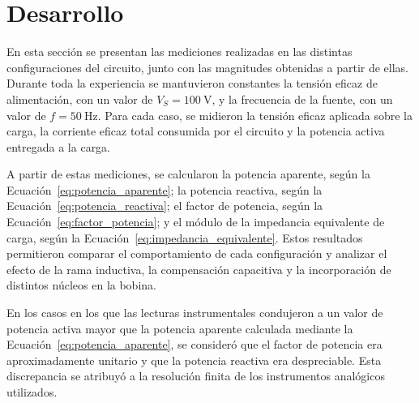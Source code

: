 
\section{Desarrollo}

En esta sección se presentan las mediciones realizadas en las distintas configuraciones del circuito, junto con las magnitudes obtenidas a partir de ellas. Durante toda la experiencia se mantuvieron constantes la tensión eficaz de alimentación, con un valor de $V_S=\SI{100}{\volt}$, y la frecuencia de la fuente, con un valor de $f=\SI{50}{\hertz}$. Para cada caso, se midieron la tensión eficaz aplicada sobre la carga, la corriente eficaz total consumida por el circuito y la potencia activa entregada a la carga.

A partir de estas mediciones, se calcularon la potencia aparente, según la Ecuación~\ref{eq:potencia_aparente}; la potencia reactiva, según la Ecuación~\ref{eq:potencia_reactiva}; el factor de potencia, según la Ecuación~\ref{eq:factor_potencia}; y el módulo de la impedancia equivalente de carga, según la Ecuación~\ref{eq:impedancia_equivalente}. Estos resultados permitieron comparar el comportamiento de cada configuración y analizar el efecto de la rama inductiva, la compensación capacitiva y la incorporación de distintos núcleos en la bobina.

En los casos en los que las lecturas instrumentales condujeron a un valor de potencia activa mayor que la potencia aparente calculada mediante la Ecuación~\ref{eq:potencia_aparente}, se consideró que el factor de potencia era aproximadamente unitario y que la potencia reactiva era despreciable. Esta discrepancia se atribuyó a la resolución finita de los instrumentos analógicos utilizados.

















\newpage
